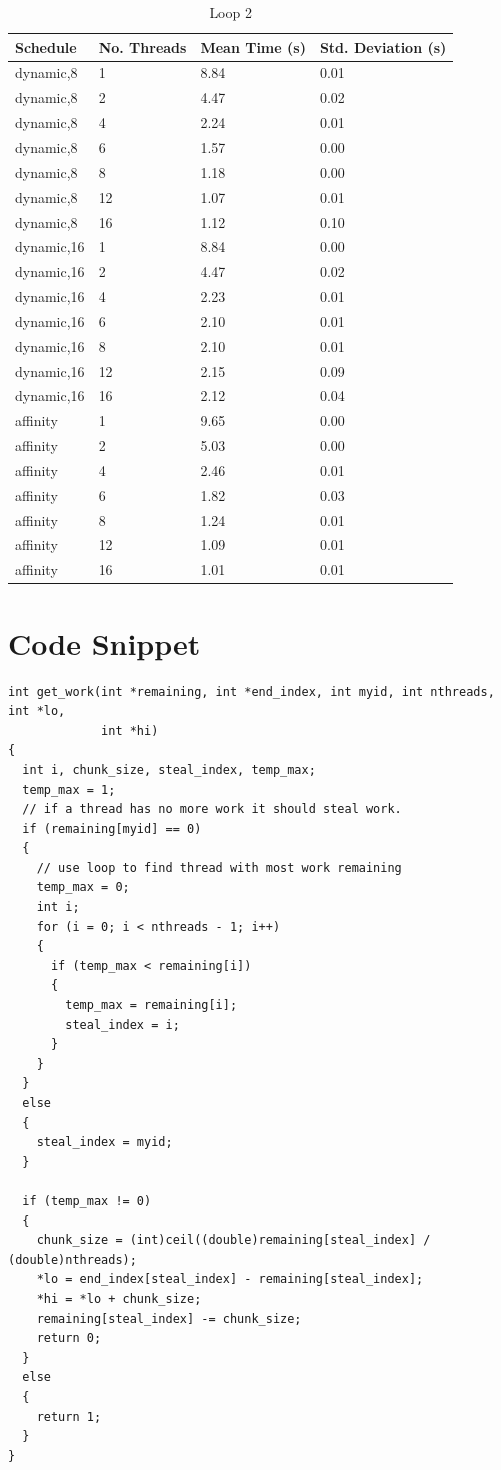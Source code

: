 \documentclass[a4paper,12pt]{article}
\begin{document}
\begin {table}
\caption {Loop 2}
\small
\center
\begin{tabular}{ | l | l | l | l | }
\hline
Schedule &  No. Threads &  Mean Time (s) &  Std. Deviation (s) \\ \hline 
dynamic,8 & 1& 8.84 & 0.01\\
dynamic,8 & 2& 4.47 & 0.02\\
dynamic,8 & 4 & 2.24 & 0.01\\
dynamic,8 & 6 & 1.57 & 0.00\\
dynamic,8 & 8 & 1.18 & 0.00\\
dynamic,8 & 12 & 1.07 & 0.01\\
dynamic,8 & 16 & 1.12 & 0.10\\
dynamic,16 & 1 & 8.84 & 0.00\\
dynamic,16 & 2 & 4.47 & 0.02\\
dynamic,16 & 4 & 2.23 & 0.01\\
dynamic,16 & 6 & 2.10 & 0.01\\
dynamic,16 & 8 & 2.10 & 0.01\\
dynamic,16 & 12 & 2.15 & 0.09\\
dynamic,16 & 16 & 2.12 & 0.04 \\ 
affinity & 1 & 9.65 & 0.00 \\
affinity & 2 & 5.03 & 0.00 \\
affinity & 4 & 2.46 & 0.01 \\
affinity & 6 & 1.82 & 0.03 \\
affinity & 8 & 1.24 & 0.01 \\
affinity & 12 & 1.09 & 0.01 \\
affinity & 16 & 1.01 & 0.01 \\ \hline
\end{tabular}
\end{table}

\pagebreak
{}
\section{Code Snippet}
\label{appendix:code}
\begin{verbatim}
int get_work(int *remaining, int *end_index, int myid, int nthreads, int *lo,
             int *hi)
{
  int i, chunk_size, steal_index, temp_max;
  temp_max = 1;
  // if a thread has no more work it should steal work.
  if (remaining[myid] == 0)
  {
    // use loop to find thread with most work remaining
    temp_max = 0;
    int i;
    for (i = 0; i < nthreads - 1; i++)
    {
      if (temp_max < remaining[i])
      {
        temp_max = remaining[i];
        steal_index = i;
      }
    }
  }
  else
  {
    steal_index = myid;
  }

  if (temp_max != 0)
  {
    chunk_size = (int)ceil((double)remaining[steal_index] / (double)nthreads);
    *lo = end_index[steal_index] - remaining[steal_index];
    *hi = *lo + chunk_size;
    remaining[steal_index] -= chunk_size;
    return 0;
  }
  else
  {
    return 1;
  }
}
\end{verbatim}
\end{document}
